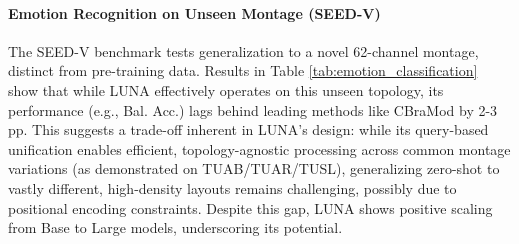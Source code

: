 \paragraph{Emotion Recognition on Unseen Montage (SEED-V)}
The SEED-V benchmark tests generalization to a novel 62-channel montage, distinct from pre-training data. Results in Table \ref{tab:emotion_classification} show that while LUNA effectively operates on this unseen topology, its performance (e.g., Bal. Acc.) lags behind leading methods like CBraMod by 2-3 pp. This suggests a trade-off inherent in LUNA's design: while its query-based unification enables efficient, topology-agnostic processing across common montage variations (as demonstrated on TUAB/TUAR/TUSL), generalizing zero-shot to vastly different, high-density layouts remains challenging, possibly due to positional encoding constraints. Despite this gap, LUNA shows positive scaling from Base to Large models, underscoring its potential.

